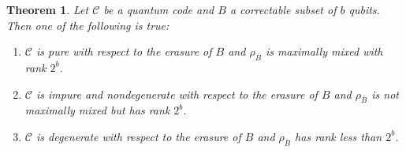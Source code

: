 \documentclass[]{amsart}
\newtheorem{theorem}{Theorem}
\begin{document}
\begin{theorem}\label{thm:degenentanglement}
    Let $\mathcal{C}$ be a quantum code and $B$ a correctable subset of $b$ qubits. Then one of the following is true:
    \begin{enumerate}
        \item $\mathcal{C}$ is pure with respect to the erasure of $B$ and $\rho_{\overline{B}}$ is maximally mixed with rank $2^b$.
        \item $\mathcal{C}$ is impure and nondegenerate with respect to the erasure of $B$ and $\rho_{\overline{B}}$ is not maximally mixed but has rank $2^b$.
        \item $\mathcal{C}$ is degenerate with respect to the erasure of $B$ and $\rho_{\overline{B}}$ has rank less than $2^b$.
    \end{enumerate}
\end{theorem}
\end{document}
